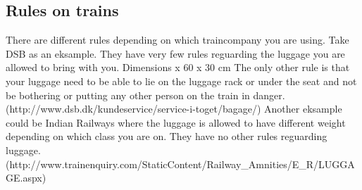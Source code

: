 \subsection{Rules on trains}

There are different rules depending on which traincompany you are using. 
\newline
Take DSB as an eksample. They have very few rules reguarding the luggage you are allowed to bring with you. 
\newline\newline
Dimensions\indent\indent\indent{} x 60 x 30 cm 
\newline\newline
The only other rule is that your luggage need to be able to lie on the luggage rack or under the seat and not be bothering or putting any other person on the train in danger. (http://www.dsb.dk/kundeservice/service-i-toget/bagage/)
\newline\newline
Another eksample could be Indian Railways where the luggage is allowed to have different weight depending on which class you are on. They have no other rules reguarding luggage. (http://www.trainenquiry.com/StaticContent/Railway\_Amnities/E\_R/LUGGAGE.aspx)